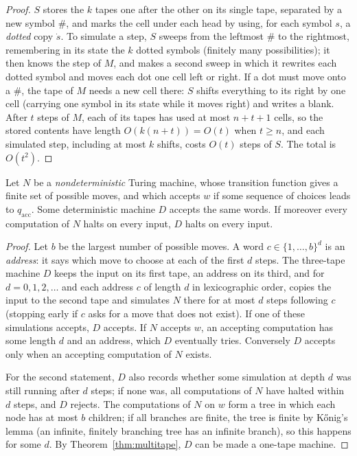 \begin{proof}
$S$ stores the $k$ tapes one after the other on its single tape, separated by a new symbol $\#$, and marks the cell under each head by using, for each symbol $s$, a \emph{dotted} copy $\dot s$. To simulate a step, $S$ sweeps from the leftmost $\#$ to the rightmost, remembering in its state the $k$ dotted symbols (finitely many possibilities); it then knows the step of $M$, and makes a second sweep in which it rewrites each dotted symbol and moves each dot one cell left or right. If a dot must move onto a $\#$, the tape of $M$ needs a new cell there: $S$ shifts everything to its right by one cell (carrying one symbol in its state while it moves right) and writes a blank. After $t$ steps of $M$, each of its tapes has used at most $n+t+1$ cells, so the stored contents have length $O(k(n+t))=O(t)$ when $t\ge n$, and each simulated step, including at most $k$ shifts, costs $O(t)$ steps of $S$. The total is $O(t^2)$.
\end{proof}

\begin{theorem}\label{thm:ntm}
Let $N$ be a \emph{nondeterministic} Turing machine, whose transition function gives a finite set of possible moves, and which accepts $w$ if some sequence of choices leads to $q_{\mathrm{acc}}$. Some deterministic machine $D$ accepts the same words. If moreover every computation of $N$ halts on every input, $D$ halts on every input.
\end{theorem}

\begin{proof}
Let $b$ be the largest number of possible moves. A word $c\in\{1,\dots,b\}^d$ is an \emph{address}: it says which move to choose at each of the first $d$ steps. The three-tape machine $D$ keeps the input on its first tape, an address on its third, and for $d=0,1,2,\dots$ and each address $c$ of length $d$ in lexicographic order, copies the input to the second tape and simulates $N$ there for at most $d$ steps following $c$ (stopping early if $c$ asks for a move that does not exist). If one of these simulations accepts, $D$ accepts. If $N$ accepts $w$, an accepting computation has some length $d$ and an address, which $D$ eventually tries. Conversely $D$ accepts only when an accepting computation of $N$ exists.

For the second statement, $D$ also records whether some simulation at depth $d$ was still running after $d$ steps; if none was, all computations of $N$ have halted within $d$ steps, and $D$ rejects. The computations of $N$ on $w$ form a tree in which each node has at most $b$ children; if all branches are finite, the tree is finite by K\H{o}nig's lemma (an infinite, finitely branching tree has an infinite branch), so this happens for some $d$. By Theorem~\ref{thm:multitape}, $D$ can be made a one-tape machine.
\end{proof}

